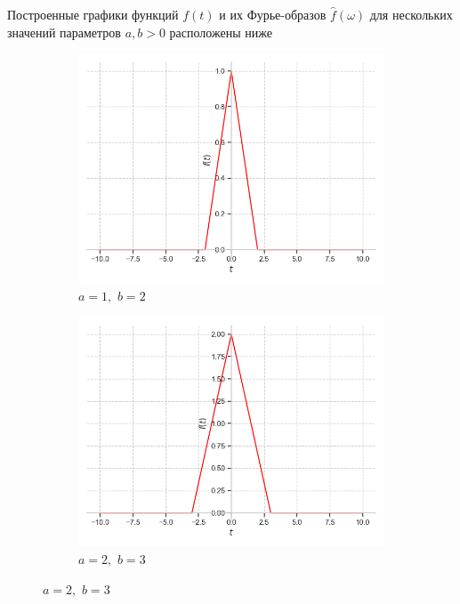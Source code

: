 \documentclass[a4paper, 16pt]{article}
\begin{document}
    \noindent Построенные графики функций $f(t)$ и их Фурье-образов
    $\hat{f}\left(\omega\right)$ для нескольких значений параметров $a,b>0$ расположены ниже
    \begin{figure}[htbp]
        \centering
        \begin{subfigure}{0.3\textwidth}
            \centering
            \includegraphics[width=\linewidth]{trif_a=1_b=2.png}
            \caption{$a=1,\,\,b=2$}
            \label{fig:triangf_1}
        \end{subfigure}
        \hfill
        \begin{subfigure}{0.3\textwidth}
            \centering
            \includegraphics[width=\linewidth]{trif_a=2_b=3.png}
            \caption{$a=2,\,\,b=3$}

\end{subfigure}
\end{figure}
\end{document}
